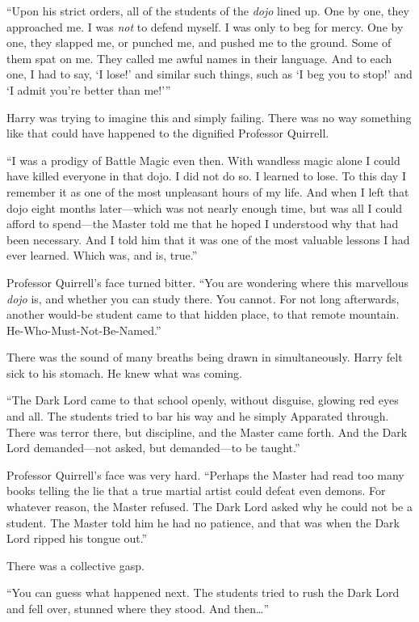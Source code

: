 “Upon his strict orders, all of the students of the \emph{dojo} lined up. One by one, they approached me. I was \emph{not} to defend myself. I was only to beg for mercy. One by one, they slapped me, or punched me, and pushed me to the ground. Some of them spat on me. They called me awful names in their language. And to each one, I had to say, ‘I lose!’ and similar such things, such as ‘I beg you to stop!’ and ‘I admit you’re better than me!’”

Harry was trying to imagine this and simply failing. There was no way something like that could have happened to the dignified Professor Quirrell.

“I was a prodigy of Battle Magic even then. With wandless magic alone I could have killed everyone in that dojo. I did not do so. I learned to lose. To this day I remember it as one of the most unpleasant hours of my life. And when I left that dojo eight months later—which was not nearly enough time, but was all I could afford to spend—the Master told me that he hoped I understood why that had been necessary. And I told him that it was one of the most valuable lessons I had ever learned. Which was, and is, true.”

Professor Quirrell’s face turned bitter. “You are wondering where this marvellous \emph{dojo} is, and whether you can study there. You cannot. For not long afterwards, another would-be student came to that hidden place, to that remote mountain. He-Who-Must-Not-Be-Named.”

There was the sound of many breaths being drawn in simultaneously. Harry felt sick to his stomach. He knew what was coming.

“The Dark Lord came to that school openly, without disguise, glowing red eyes and all. The students tried to bar his way and he simply Apparated through. There was terror there, but discipline, and the Master came forth. And the Dark Lord demanded—not asked, but demanded—to be taught.”

Professor Quirrell’s face was very hard. “Perhaps the Master had read too many books telling the lie that a true martial artist could defeat even demons. For whatever reason, the Master refused. The Dark Lord asked why he could not be a student. The Master told him he had no patience, and that was when the Dark Lord ripped his tongue out.”

There was a collective gasp.

“You can guess what happened next. The students tried to rush the Dark Lord and fell over, stunned where they stood. And then…”

